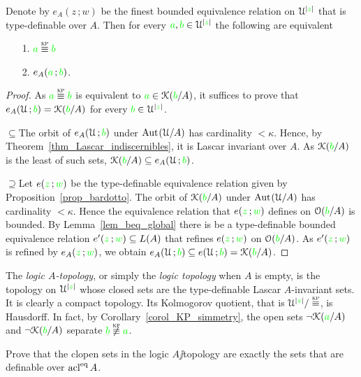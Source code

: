 \documentclass[creche.tex]{subfiles}
\begin{document}
\begin{theorem}\label{thm_Krupinski}
Denote by $e_A(z\,;w)$ be the finest bounded equivalence relation on $\EuScript U^{|{\color{green} z}|}$ that is type-definable over $A$. Then for every ${\color{green} a}, {\color{green} b}\in\EuScript U^{|{\color{green} z}|}$ the following are equivalent
 \begin{itemize}
\item[1.] ${\gr a}\equivKP{\gr b}$
\item[2.] $e_A({\color{green} a}\,;{\color{green} b})$.\QED
\end{itemize} 
\end{theorem}
\begin{proof} 
  As  ${\gr a}\equivKP{\gr b}$ is equivalent to ${\color{green} a}\in\EuScript K({\color{green} b}/A)$, it suffices to prove that $e_A(\EuScript U\,;{\color{green} b})=\EuScript K({\color{green} b}/A)$ for every ${\color{green} b}\in\EuScript U^{|{\color{green} z}|}$. 
 
  $\subseteq$\quad The orbit of $e_A(\EuScript U\,;{\color{green} b})$ under $\textrm{Aut\kern.15ex}(\EuScript U/A)$ has cardinality $<\kappa$. Hence, by Theorem~\ref{thm_Lascar_indiscernibles}, it is  Lascar invariant over $A$. As $\EuScript K({\color{green} b}/A)$ is the least of such sets, $\EuScript K({\color{green} b}/A)\subseteq e_A(\EuScript U\,;{\color{green} b})$.
  
  $\supseteq$\quad Let $e({\color{green} z}\,;{\color{green} w})$ be the type-definable equivalence relation given by Proposition~\ref{prop_bardotto}. The orbit of $\EuScript K({\color{green} b}/A)$ under $\textrm{Aut\kern.15ex}(\EuScript U/A)$ has cardinality $<\kappa$. Hence the equivalence relation that $e({\color{green} z}\,;{\color{green} w})$ defines on $\EuScript O({\color{green} b}/A)$ is bounded. By Lemma~\ref{lem_beq_global} there is  be a type-definable bounded equivalence relation $e'({\color{green} z}\,;{\color{green} w})\subseteq L(A)$ that refines $e({\color{green} z}\,;{\color{green} w})$ on $\EuScript O({\color{green} b}/A)$. As $e'({\color{green} z}\,;{\color{green} w})$ is refined by $e_A({\color{green} z}\,;{\color{green} w})$, we obtain $e_A(\EuScript U\,;{\color{green} b})\subseteq e(\EuScript U\,;{\color{green} b})=\EuScript K({\color{green} b}/A)$.
\end{proof}


The \emph{logic $A$-topology}, or simply the  \emph{logic topology} when $A$ is empty, is the topology on $\EuScript U^{|{\color{green} z}|}$ whose closed sets are the type-definable Lascar $A$-invariant sets. It is clearly a compact topology. Its Kolmogorov quotient, that is $\U^{|{\gr z}|}/\equivKP$, is Hausdorff. In fact, by Corollary~\ref{corol_KP_simmetry}, the open sets $\neg\EuScript K({\color{green} a}/A)$ and $\neg\EuScript K({\color{green} b}/A)$ separate ${\gr b}\not\equivKP{\gr a}$.

\begin{exercise}
Prove that the clopen sets in the logic $A\jj$topology are exactly the sets that are definable over $\mathop{\rm acl}^{{\rm eq}} A$.\QED
\end{exercise}
\end{document}
